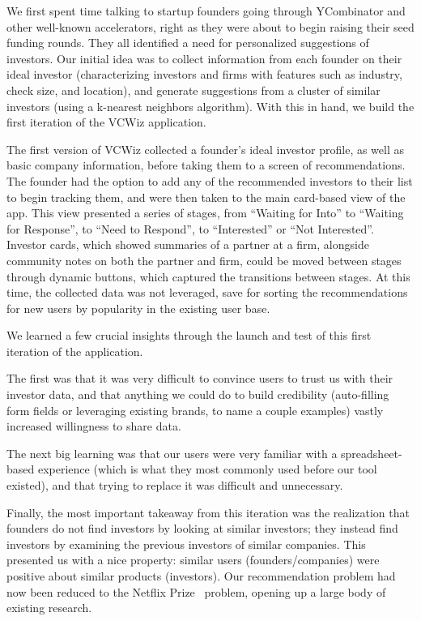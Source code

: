 We first spent time talking to startup founders going through YCombinator and other well-known accelerators, right as they were about to begin raising their seed funding rounds. They all identified a need for personalized suggestions of investors. Our initial idea was to collect information from each founder on their ideal investor (characterizing investors and firms with features such as industry, check size, and location), and generate suggestions from a cluster of similar investors (using a k-nearest neighbors algorithm). With this in hand, we build the first iteration of the VCWiz application.

The first version of VCWiz collected a founder's ideal investor profile, as well as basic company information, before taking them to a screen of recommendations. The founder had the option to add any of the recommended investors to their list to begin tracking them, and were then taken to the main card-based view of the app. This view presented a series of stages, from ``Waiting for Into'' to ``Waiting for Response'', to ``Need to Respond'', to ``Interested'' or ``Not Interested''. Investor cards, which showed summaries of a partner at a firm, alongside community notes on both the partner and firm, could be moved between stages through dynamic buttons, which captured the transitions between stages. At this time, the collected data was not leveraged, save for sorting the recommendations for new users by popularity in the existing user base.

We learned a few crucial insights through the launch and test of this first iteration of the application.

The first was that it was very difficult to convince users to trust us with their investor data, and that anything we could do to build credibility (auto-filling form fields or leveraging existing brands, to name a couple examples) vastly increased willingness to share data.

The next big learning was that our users were very familiar with a spreadsheet-based experience (which is what they most commonly used before our tool existed), and that trying to replace it was difficult and unnecessary.

Finally, the most important takeaway from this iteration was the realization that founders do not find investors by looking at similar investors; they instead find investors by examining the previous investors of similar companies. This presented us with a nice property: similar users (founders/companies) were positive about similar products (investors). Our recommendation problem had now been reduced to the Netflix Prize~\cite{netflixpize} problem, opening up a large body of existing research.

